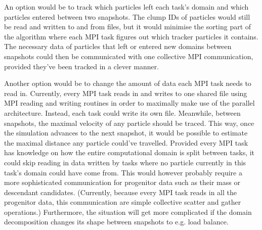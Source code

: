 An option would be to track which particles left each task's domain and which particles entered between two snapshots.
The clump IDs of particles would still be read and written to and from files, but it would minimise the sorting part of the algorithm where each MPI task figures out which tracker particles it contains.
The necessary data of particles that left or entered new domains between snapshots could then be communicated with one collective MPI communication, provided they've been tracked in a clever manner.

Another option would be to change the amount of data each MPI task needs to read in.
Currently, every MPI task reads in and writes to one shared file using MPI reading and writing routines in order to maximally make use of the parallel architecture.
Instead, each task could write its own file.
Meanwhile, between snapshots, the maximal velocity of any particle should be traced.
This way, once the simulation advances to the next snapshot, it would be possible to estimate the maximal distance any particle could've travelled.
Provided every MPI task has knowledge on how the entire computational domain is split between tasks, it could skip reading in data written by tasks where no particle currently in this task's domain could have come from.
This would however probably require a more sophisticated communication for progenitor data such as their mass or descendant candidates.
(Currently, because every MPI task reads in all the progenitor data, this communication are simple collective scatter and gather operations.)
Furthermore, the situation will get more complicated if the domain decomposition changes its shape between snapshots to e.g. load balance.





